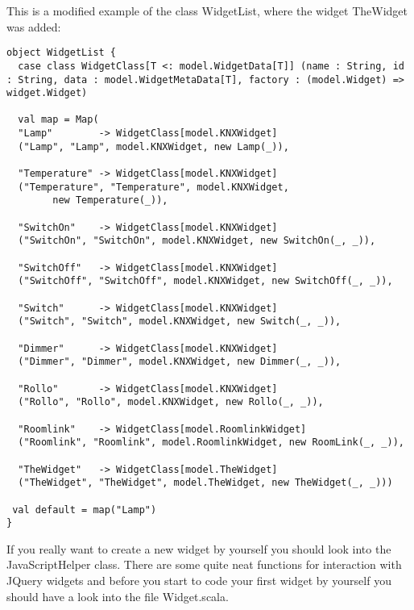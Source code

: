 This is a modified example of the class WidgetList, where the widget TheWidget was added:
\begin{lstlisting}[caption=widget list ,label=lst:h2h:widgetlist]
object WidgetList {
  case class WidgetClass[T <: model.WidgetData[T]] (name : String, id : String, data : model.WidgetMetaData[T], factory : (model.Widget) => widget.Widget)

  val map = Map(
  "Lamp"        -> WidgetClass[model.KNXWidget]
  ("Lamp", "Lamp", model.KNXWidget, new Lamp(_)),

  "Temperature" -> WidgetClass[model.KNXWidget]
  ("Temperature", "Temperature", model.KNXWidget,
        new Temperature(_)),

  "SwitchOn"    -> WidgetClass[model.KNXWidget]
  ("SwitchOn", "SwitchOn", model.KNXWidget, new SwitchOn(_, _)),

  "SwitchOff"   -> WidgetClass[model.KNXWidget]
  ("SwitchOff", "SwitchOff", model.KNXWidget, new SwitchOff(_, _)),

  "Switch"      -> WidgetClass[model.KNXWidget]
  ("Switch", "Switch", model.KNXWidget, new Switch(_, _)),

  "Dimmer"      -> WidgetClass[model.KNXWidget]
  ("Dimmer", "Dimmer", model.KNXWidget, new Dimmer(_, _)),

  "Rollo"       -> WidgetClass[model.KNXWidget]
  ("Rollo", "Rollo", model.KNXWidget, new Rollo(_, _)),

  "Roomlink"    -> WidgetClass[model.RoomlinkWidget]
  ("Roomlink", "Roomlink", model.RoomlinkWidget, new RoomLink(_, _)),

  "TheWidget"   -> WidgetClass[model.TheWidget]
  ("TheWidget", "TheWidget", model.TheWidget, new TheWidget(_, _)))

 val default = map("Lamp")
}
\end{lstlisting}

If you really want to create a new widget by yourself you should look into the JavaScriptHelper class. There are some quite neat functions for interaction with JQuery widgets and before you start to code your first widget by yourself you should have a look into the file Widget.scala. 